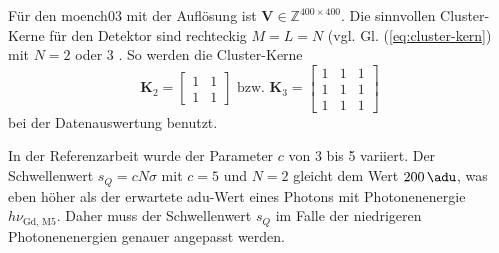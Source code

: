 \noindent
Für den \gls{moench03} mit der Auflösung  ist $\mathbf{V} \in \mathbb{Z}^{400\times 400}$. Die sinnvollen Cluster-Kerne für den Detektor sind rechteckig $M=L=N$ (vgl. Gl. (\ref{eq:cluster-kern}) mit $N = 2$ oder 3 \cite[Abschnitt 4]{cartier_micron_2014}. So werden die Cluster-Kerne
\begin{equation}
    \mathbf{K}_{2} = \begin{bmatrix}
1 & 1\\
1 & 1
\end{bmatrix}
\text{ bzw. }
    \mathbf{K}_{3} = \begin{bmatrix}
1 & 1 & 1\\
1 & 1 & 1\\
1 & 1 & 1
\end{bmatrix}
\end{equation}
bei der Datenauswertung benutzt.

\noindent
In der Referenzarbeit wurde der Parameter $c$ von 3 bis 5 variiert. Der Schwellenwert $s_Q = cN\sigma$ mit $c=5$ und $N=2$ gleicht dem Wert $\SI{200}{\adu}$, was eben höher als der erwartete \gls{adu}-Wert eines Photons mit Photonenenergie $h\nu_\text{Gd, M5}$. Daher muss der Schwellenwert $s_Q$ im Falle der niedrigeren Photonenenergien genauer angepasst werden.


